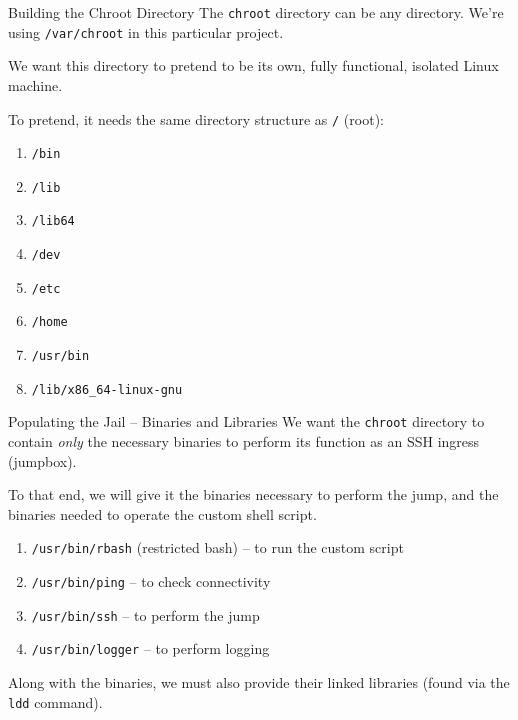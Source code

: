 \documentclass[14pt,compress,dvipsnames,aspectratio=169]{beamer} %
\begin{document}
\begin{frame}{Building the Chroot Directory}
    The \texttt{chroot} directory can be any directory. We're using
    \texttt{/var/chroot} in this particular project.

    We want this directory to pretend to be its own, fully functional, isolated Linux machine.  

    To pretend, it needs the same directory structure as \texttt{/} (root):  
    \begin{enumerate}
        \item{\texttt{/bin}} 
        \item{\texttt{/lib}} 
        \item{\texttt{/lib64}} 
        \item{\texttt{/dev}} 
        \item{\texttt{/etc}} 
        \item{\texttt{/home}} 
        \item{\texttt{/usr/bin}} 
        \item{\texttt{/lib/x86\_64-linux-gnu}} 
    \end{enumerate}
\end{frame}


\begin{frame}{Populating the Jail -- Binaries and Libraries}
    We want the \texttt{chroot} directory to contain \textit{only} the necessary
    binaries to perform its function as an SSH ingress (jumpbox).  

    To that end, we will give it the binaries necessary to perform the jump, and the
    binaries needed to operate the custom shell script.  
    \begin{enumerate}
        \item{\texttt{/usr/bin/rbash} (restricted bash) -- to run the custom script} 
        \item{\texttt{/usr/bin/ping} -- to check connectivity} 
        \item{\texttt{/usr/bin/ssh} -- to perform the jump} 
        \item{\texttt{/usr/bin/logger} -- to perform logging} 
    \end{enumerate}
    Along with the binaries, we must also provide their linked libraries (found via
    the \texttt{ldd} command).  
\end{frame}
\end{document}
